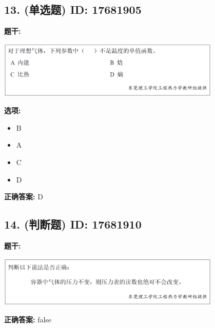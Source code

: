 \documentclass[12pt]{article}
\begin{document}
\subsection*{13. (单选题) \small ID: 17681905}

\textbf{题干:}


\begin{center}\includegraphics[width=0.8\textwidth, height=0.25\textheight, keepaspectratio]{question_13_17681905/title_img_1.png}\end{center}

\textbf{选项:}
\begin{itemize}[leftmargin=*]
  \item B

  \item A

  \item C

  \item D

\end{itemize}

\textbf{正确答案:}
D

\vspace{0.5em}\hrulefill\vspace{1em}

\subsection*{14. (判断题) \small ID: 17681910}

\textbf{题干:}


\begin{center}\includegraphics[width=0.8\textwidth, height=0.25\textheight, keepaspectratio]{question_14_17681910/title_img_1.png}\end{center}

\textbf{正确答案:}
false

\vspace{0.5em}\hrulefill\vspace{1em}
\end{document}
